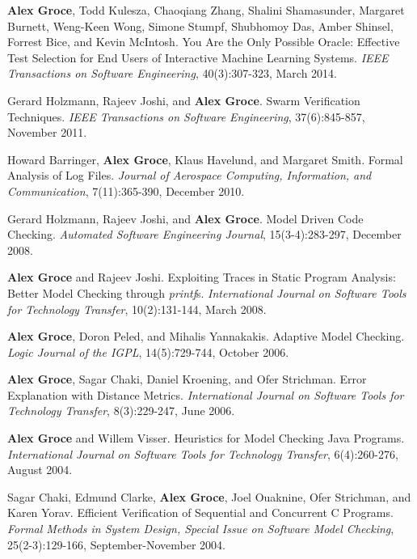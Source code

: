 \documentclass[ComputerScience]{vita}
\begin{document}
\begin{vita}
\begin{Refereed Journal Publications}
\item
{\bf Alex Groce}, Todd Kulesza, Chaoqiang Zhang, Shalini Shamasunder, Margaret Burnett, Weng-Keen Wong, Simone Stumpf, Shubhomoy Das, Amber Shinsel, Forrest Bice, and Kevin McIntosh.
\newblock You Are the Only Possible Oracle: Effective Test Selection for End Users of Interactive Machine Learning Systems.
\newblock \emph{IEEE Transactions on Software Engineering}, 40(3):307-323, March 2014.

\item 
Gerard Holzmann, Rajeev Joshi, and {\bf Alex Groce}.
\newblock Swarm Verification Techniques.
\newblock \emph{IEEE Transactions on Software Engineering}, 37(6):845-857, November 2011.

\item
Howard Barringer, {\bf Alex Groce}, Klaus Havelund, and Margaret Smith.
\newblock Formal Analysis of Log Files.
\newblock \emph{Journal of Aerospace Computing, Information, and Communication}, 7(11):365-390, December 2010.

\item Gerard Holzmann, Rajeev Joshi, and {\bf Alex Groce}.
\newblock Model Driven Code Checking.
\newblock \emph{Automated Software Engineering Journal}, 15(3-4):283-297, December 2008.

\item
{\bf Alex Groce} and Rajeev Joshi.
\newblock Exploiting Traces in Static Program Analysis: Better Model Checking through \emph{printf}s.
\newblock \emph{International Journal on Software Tools for Technology Transfer}, 10(2):131-144, March 2008.

\item
{\bf Alex Groce}, Doron Peled, and Mihalis Yannakakis.
\newblock Adaptive Model Checking.
\newblock \emph{Logic Journal of the IGPL}, 14(5):729-744, October 2006.

\item
{\bf Alex Groce}, Sagar Chaki, Daniel Kroening, and Ofer Strichman.
\newblock Error Explanation with Distance Metrics.
\newblock \emph{International Journal on Software Tools for Technology Transfer}, 8(3):229-247, June 2006.

\item
{\bf Alex Groce} and Willem Visser.
\newblock Heuristics for Model Checking Java Programs.
\newblock \emph{International Journal on Software Tools for Technology Transfer}, 6(4):260-276, August 2004.


\item
Sagar Chaki, Edmund Clarke, {\bf Alex Groce}, Joel Ouaknine, Ofer Strichman, and Karen Yorav.
\newblock Efficient Verification of Sequential and Concurrent C Programs.
\newblock \emph{Formal Methods in System Design, Special Issue on Software Model Checking}, 25(2-3):129-166, September-November 2004.


\end{Refereed Journal Publications}
\end{vita}
\end{document}
